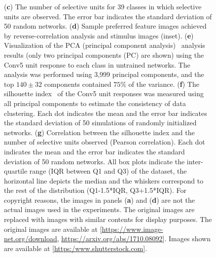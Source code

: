 \documentclass[sn-mathphys-num]{sn-jnl}%
\theoremstyle{thmstyleone}%
\theoremstyle{thmstyletwo}%
\theoremstyle{thmstylethree}%
\begin{document}
\begin{figure}[!htb]
{		(\textbf{c}) The number of selective units for 39 classes in which selective units are observed.
		The error bar indicates the standard deviation of 50 random networks.
		(\textbf{d}) Sample preferred feature images achieved by reverse-correlation analysis and stimulus images (inset).
		(\textbf{e}) Visualization of the PCA (principal component analysis)~\cite{wold1987principal} analysis results (only two principal components (PC) are shown) using the Conv5 unit response to each class in untrained networks.
		The analysis was performed using 3,999 principal components, and the top $140 \pm 32$ components contained $ 75\% $ of the variance.
		(\textbf{f}) The silhouette index~\cite{kaufman2009finding} of the Conv5 unit responses was measured using all principal components to estimate the consistency of data clustering.
		Each dot indicates the mean and the error bar indicates the standard deviation of 50 simulations of randomly initialized networks.
		(\textbf{g}) Correlation between the silhouette index and the number of selective units observed (Pearson correlation).
		Each dot indicates the mean and the error bar indicates the standard deviation of 50 random networks.
		All box plots indicate the inter-quartile range (IQR between Q1 and Q3) of the dataset, the horizontal line depicts the median and the whiskers correspond to the rest of the distribution (Q1-1.5*IQR, Q3+1.5*IQR).
		For copyright reasons, the images in panels (\textbf{a}) and (\textbf{d}) are not the actual images used in the experiments.
		The original images are replaced with images with similar contents for display purposes.
		The original images are available at [\url{https://www.image-net.org/download}, \url{https://arxiv.org/abs/1710.08092}].
		Images shown are available at [\url{https:/www.shutterstock.com}].
	} \label{fig:image_net}
\end{figure}
\end{document}
